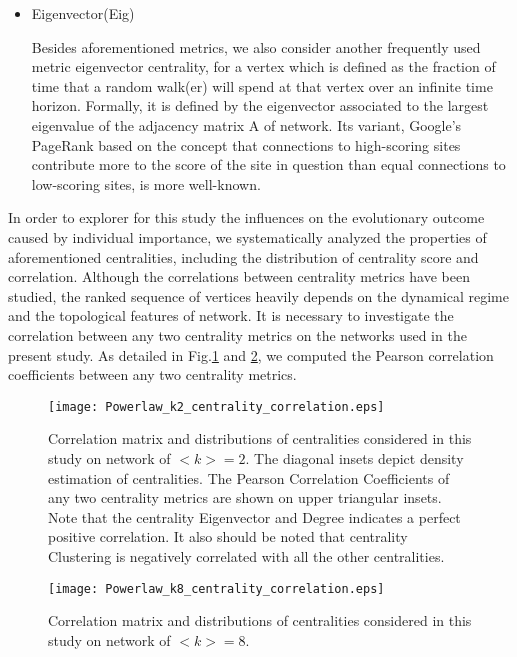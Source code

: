 \documentclass[preprint,12pt,3p]{elsarticle}
\begin{document}
\begin{itemize}
\item Eigenvector(Eig)

Besides aforementioned metrics, we also consider another frequently used metric eigenvector centrality,
for a vertex which is defined as the fraction of time that a random walk(er) will spend at that vertex
over an infinite time horizon.
Formally, it is defined by the eigenvector associated to the largest eigenvalue
of the adjacency matrix A of network.
Its variant, Google's PageRank based on the concept that connections to high-scoring sites contribute
more to the score of the site in question than equal connections to low-scoring sites, is more well-known.

\end{itemize}


In order to explorer for this study the influences on the evolutionary outcome
caused by individual importance, we systematically analyzed the properties of aforementioned
centralities, including the distribution of centrality score and correlation.
Although the correlations between centrality metrics have been studied\cite{LiLi-18181,šikićLančić-17843},
the ranked sequence of vertices heavily depends on the dynamical regime and the topological features of network.
It is necessary to investigate the correlation between any two centrality metrics on
the networks used in the present study.
As detailed in Fig.\ref{fig corr centrality k=2} and \ref{fig corr centrality k=8}, we computed the Pearson correlation coefficients
between any two centrality metrics.

\begin{figure}
  \centering
  \texttt{[image: Powerlaw\_k2\_centrality\_correlation.eps]}
  \caption{Correlation matrix and distributions of centralities considered in this study on network of $<k>=2$.
  The diagonal insets depict density estimation of centralities.
  The Pearson Correlation Coefficients of any two centrality metrics are shown on upper triangular insets.
  Note that the centrality Eigenvector and Degree indicates a perfect positive correlation.
  It also should be noted that centrality Clustering is negatively correlated with all the other centralities.
    }
  \label{fig corr centrality k=2}
\end{figure}

\begin{figure}
  \centering
  \texttt{[image: Powerlaw\_k8\_centrality\_correlation.eps]}
  \caption{Correlation matrix and distributions of centralities considered in this study on network of $<k>=8$.
  }
  \label{fig corr centrality k=8}
\end{figure}
\end{document}
